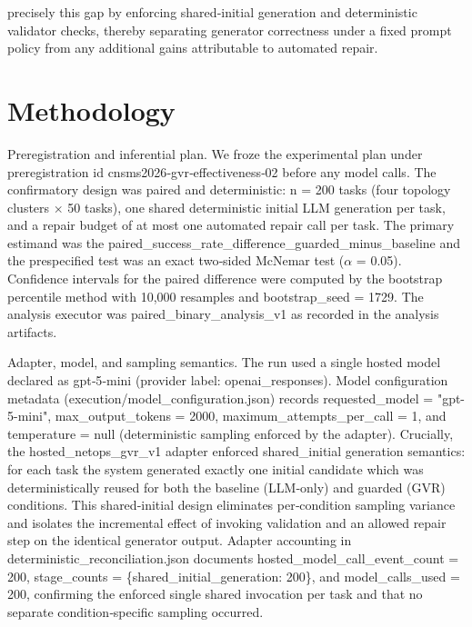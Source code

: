 \documentclass[conference]{IEEEtran}
\begin{document}
precisely this gap by enforcing shared‑initial generation and deterministic validator checks, thereby separating generator correctness under a fixed prompt policy from any additional gains attributable to automated repair.

\section{Methodology}
Preregistration and inferential plan. We froze the experimental plan under preregistration id cnsms2026‑gvr‑effectiveness‑02 before any model calls. The confirmatory design was paired and deterministic: n = 200 tasks (four topology clusters \ensuremath{\times} 50 tasks), one shared deterministic initial LLM generation per task, and a repair budget of at most one automated repair call per task. The primary estimand was the paired\_success\_rate\_difference\_guarded\_minus\_baseline and the prespecified test was an exact two‑sided McNemar test (\ensuremath{\alpha} = 0.05). Confidence intervals for the paired difference were computed by the bootstrap percentile method with 10,000 resamples and bootstrap\_seed = 1729. The analysis executor was paired\_binary\_analysis\_v1 as recorded in the analysis artifacts.

Adapter, model, and sampling semantics. The run used a single hosted model declared as gpt‑5‑mini (provider label: openai\_responses). Model configuration metadata (execution/model\_configuration.json) records requested\_model = "gpt-5-mini", max\_output\_tokens = 2000, maximum\_attempts\_per\_call = 1, and temperature = null (deterministic sampling enforced by the adapter). Crucially, the hosted\_netops\_gvr\_v1 adapter enforced shared\_initial generation semantics: for each task the system generated exactly one initial candidate which was deterministically reused for both the baseline (LLM‑only) and guarded (GVR) conditions. This shared‑initial design eliminates per‑condition sampling variance and isolates the incremental effect of invoking validation and an allowed repair step on the identical generator output. Adapter accounting in deterministic\_reconciliation.json documents hosted\_model\_call\_event\_count = 200, stage\_counts = \{shared\_initial\_generation: 200\}, and model\_calls\_used = 200, confirming the enforced single shared invocation per task and that no separate condition‑specific sampling occurred.
\end{document}
